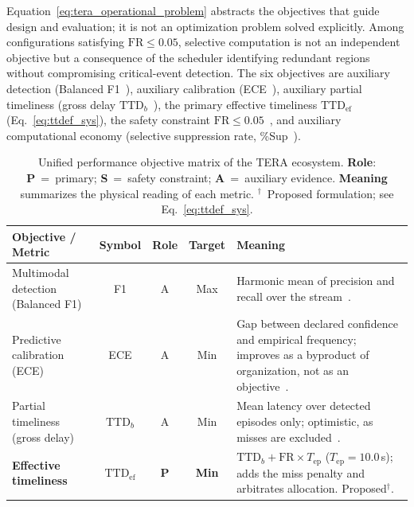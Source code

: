 \documentclass[a4paper,fleqn]{cas-dc}
\begin{document}
Equation~\ref{eq:tera_operational_problem} abstracts the objectives that guide
design and evaluation; it is not an optimization problem solved explicitly.
Among configurations satisfying $\mathrm{FR}\le0.05$, selective computation is
not an independent objective but a consequence of the scheduler identifying
redundant regions without compromising critical-event detection. The six
objectives are auxiliary detection (Balanced F1~\cite{chinchor1992muc}),
auxiliary calibration (ECE~\cite{guo2017calibration}), auxiliary partial
timeliness (gross delay $\mathrm{TTD}_b$~\cite{fawcett1999activity}), the
primary effective timeliness $\mathrm{TTD}_{\mathrm{ef}}$ (Eq.~\ref{eq:ttdef_sys}),
the safety constraint $\mathrm{FR}\le0.05$~\cite{iso26262}, and auxiliary
computational economy (selective suppression rate,
\%Sup~\cite{campos2018skip}).
\begin{table}[!tbp]
\centering
\caption{Unified performance objective matrix of the TERA ecosystem.
\textbf{Role}: \textbf{P}~=~primary; \textbf{S}~=~safety constraint;
\textbf{A}~=~auxiliary evidence. \textbf{Meaning} summarizes the physical
reading of each metric. $^\dagger$~Proposed formulation; see
Eq.~\ref{eq:ttdef_sys}.}
\label{tab:objetivos_expandida}
\footnotesize
\setlength{\tabcolsep}{4pt}
\renewcommand{\arraystretch}{1.12}
\begin{tabularx}{\textwidth}{>{\raggedright\arraybackslash}p{2.9cm}
  c c c
  >{\raggedright\arraybackslash}X}
\toprule
\textbf{Objective / Metric} & \textbf{Symbol}
  & \textbf{Role} & \textbf{Target} & \textbf{Meaning} \\
\midrule
Multimodal detection (Balanced F1)
  & F1 & A & Max
  & Harmonic mean of precision and recall over the stream~\cite{chinchor1992muc}. \\
\rowcolor{gray!8}
Predictive calibration (ECE)
  & ECE & A & Min
  & Gap between declared confidence and empirical frequency; improves as a
    byproduct of organization, not as an objective~\cite{guo2017calibration}. \\
Partial timeliness (gross delay)
  & $\mathrm{TTD}_{b}$ & A & Min
  & Mean latency over detected episodes only; optimistic, as misses are
    excluded~\cite{fawcett1999activity}. \\
\rowcolor{blue!6}
\textbf{Effective timeliness}
  & $\mathrm{TTD}_{\mathrm{ef}}$ & \textbf{P} & \textbf{Min}
  & $\mathrm{TTD}_{b} + \mathrm{FR}\times T_{\mathrm{ep}}$ ($T_{\mathrm{ep}}{=}10.0$\,s);
    adds the miss penalty and arbitrates allocation. Proposed$^\dagger$. \\

\end{tabularx}
\end{table}
\end{document}
